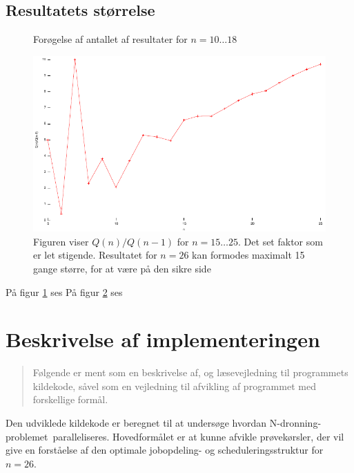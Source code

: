 \documentclass[draft,a4paper,11pt]{article}
\newcommand{\nq}{N-dronning-problemet}
\begin{document}
\subsection{Resultatets størrelse}
\begin{figure}
\caption{Forøgelse af antallet af resultater for $n=10\ldots18$}
\label{solrelativecount}
\end{figure}


\begin{figure}[h]
\begin{center}
\includegraphics{../benchmarks/resultatstorrelse.pdf}
\caption{Figuren viser $Q(n)/Q(n-1)$ for $n=15\ldots25$. Det set faktor som er let stigende. Resultatet for $n=26$ kan formodes maximalt 15 gange større, for at være på den sikre side}
\label{figur:loesningfaktor}
\end{center}
\end{figure}



På figur \ref{solrelativecount} ses
På figur \ref{figur:loesningfaktor} ses


\section{Beskrivelse af implementeringen}\label{implementering}
\begin{verse}
	Følgende er ment som en beskrivelse af, og læsevejledning til programmets kildekode, såvel som en vejledning til afvikling af programmet med forskellige formål. 
\end{verse}

Den udviklede kildekode er beregnet til at undersøge hvordan \nq\ paralleliseres. Hovedformålet er at kunne afvikle prøvekørsler, der vil give en forståelse af den optimale jobopdeling- og scheduleringsstruktur for $n=26$.
\end{document}
